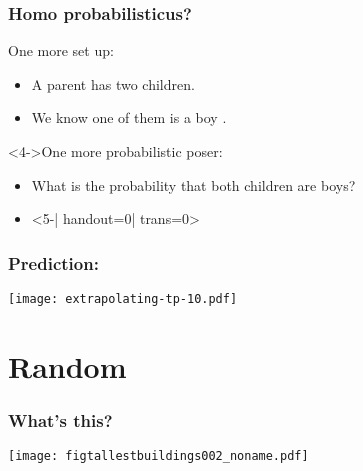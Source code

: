 \begin{frame}
  \frametitle{Homo probabilisticus?}

  \begin{block}{One more set up:}
    \begin{itemize}
    \item<2->
      A parent has two children.
    \item<3->
      We know one of them is a boy .
    \end{itemize}
  \end{block}
  
  \begin{block}<4->{One more probabilistic poser:}
    \begin{itemize}
    \item<4->
      What is the probability that both
      children are boys?
    \item<5-| handout=0| trans=0>
    \end{itemize}
  \end{block}

\end{frame}

\begin{frame}
  \frametitle{Prediction:}

  \texttt{[image: extrapolating-tp-10.pdf]}\\

\end{frame}

\section{Random}


\begin{frame}
  \frametitle{What's this?}
  
  \texttt{[image: figtallestbuildings002\_noname.pdf]}

\end{frame}



